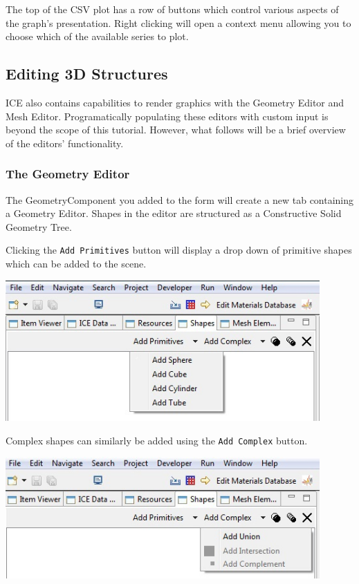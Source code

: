\documentclass{article}
\begin{document}
The top of the CSV plot has a row of buttons which control various aspects of
the graph's presentation. Right clicking will open a context menu allowing you
to choose which of the available series to plot.


\subsection{Editing 3D Structures}

ICE also contains capabilities to render graphics with the Geometry Editor and
Mesh Editor. Programatically populating these editors with custom input is
beyond the scope of this tutorial. However, what follows will be a brief
overview of the editors' functionality.

\subsubsection{The Geometry Editor}

The GeometryComponent you added to the form will create a new tab containing a
Geometry Editor. Shapes in the editor are structured as a Constructive Solid
Geometry Tree. 

Clicking the \texttt{Add Primitives} button will display a drop down of
primitive shapes which can be added to the scene.

\begin{center}
\includegraphics[width=12cm]{images/AddPrimitiveShape}
\end{center}

Complex shapes can similarly be added using the \texttt{Add Complex} button.

\begin{center}
\includegraphics[width=12cm]{images/AddComplexShape}
\end{center}
\end{document}
